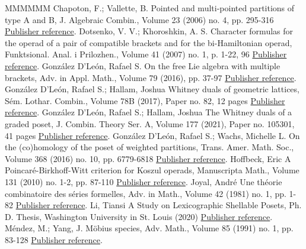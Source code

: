 \begin{thebibliography}{MMMMMM}
 Chapoton, F.; Vallette, B. Pointed and multi-pointed partitions of type A and B, J. Algebraic Combin., Volume 23 (2006) no. 4, pp. 295-316 \href{https://alco.centre-mersenne.org/articles/10.5802/alco.455/#ChapotonVallete2006}{Publisher reference}.
 Dotsenko, V. V.; Khoroshkin, A. S. Character formulas for the operad of a pair of compatible brackets and for the bi-Hamiltonian operad, Funktsional. Anal. i Prilozhen., Volume 41 (2007) no. 1, p. 1-22, 96 \href{https://alco.centre-mersenne.org/articles/10.5802/alco.455/#DotsenkoKhoroshkin2007}{Publisher reference}.
 González D’León, Rafael S. On the free Lie algebra with multiple brackets, Adv. in Appl. Math., Volume 79 (2016), pp. 37-97 \href{https://alco.centre-mersenne.org/articles/10.5802/alco.455/#Gonzalez2016}{Publisher reference}.
 González D’León, Rafael S.; Hallam, Joshua Whitney duals of geometric lattices, Sém. Lothar. Combin., Volume 78B (2017), Paper no. 82, 12 pages \href{https://alco.centre-mersenne.org/articles/10.5802/alco.455/#GonzalezHallam2017}{Publisher reference}.
 González D’León, Rafael S.; Hallam, Joshua The Whitney duals of a graded poset, J. Combin. Theory Ser. A, Volume 177 (2021), Paper no. 105301, 41 pages \href{https://alco.centre-mersenne.org/articles/10.5802/alco.455/#GonzalezHallam2021}{Publisher reference}.
 González D’León, Rafael S.; Wachs, Michelle L. On the (co)homology of the poset of weighted partitions, Trans. Amer. Math. Soc., Volume 368 (2016) no. 10, pp. 6779-6818 \href{https://alco.centre-mersenne.org/articles/10.5802/alco.455/#GonzalezDleonWachs2016}{Publisher reference}.
 Hoffbeck, Eric A Poincaré-Birkhoff-Witt criterion for Koszul operads, Manuscripta Math., Volume 131 (2010) no. 1-2, pp. 87-110 \href{https://alco.centre-mersenne.org/articles/10.5802/alco.455/#Hoffbeck2010}{Publisher reference}.
 Joyal, André Une théorie combinatoire des séries formelles, Adv. in Math., Volume 42 (1981) no. 1, pp. 1-82 \href{https://alco.centre-mersenne.org/articles/10.5802/alco.455/#Joyal1981}{Publisher reference}.
 Li, Tiansi A Study on Lexicographic Shellable Posets, Ph. D. Thesis, Washington University in St. Louis (2020) \href{https://alco.centre-mersenne.org/articles/10.5802/alco.455/#Tiansi2020}{Publisher reference}.
 Méndez, M.; Yang, J. Möbius species, Adv. Math., Volume 85 (1991) no. 1, pp. 83-128 \href{https://alco.centre-mersenne.org/articles/10.5802/alco.455/#MendezYang1991}{Publisher reference}.

\end{thebibliography}
